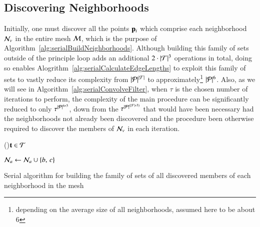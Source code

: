 \subsection{Discovering Neighborhoods}
\label{ch5sSIssDN}
Initially, one must discover all the points $\mathbf{p}_i$ which comprise each neighborhood $\mathcal{N}_v$ in the entire mesh $\mathcal{M}$, which is the purpose of Algorithm~\ref{alg:serialBuildNeighborhoods}. Although building this family of sets outside of the principle loop adds an additional $2\cdot |\mathcal{T}|^3$ operations in total, doing so enables Alogrithm~\ref{alg:serialCalculateEdgeLengths} to exploit this family of sets to vastly reduce its complexity from $|\mathcal{P}|^{|\mathcal{T}|}$ to approximately\footnote{depending on the average size of all neighborhoods, assumed here to be about 6} $|\mathcal{P}|^6$. Also, as we will see in Algorithm~\ref{alg:serialConvolveFilter}, when $\tau$ is the chosen number of iterations to perform, the complexity of the main procedure can be significantly reduced to only $\tau^{|\mathcal{P}|^{6*3}}$, down from the $\tau^{|\mathcal{P}|^{(|\mathcal{F}|*3)}}$ that would have been necessary had the neighborhoods not already been discovered and the procedure been otherwise required to discover the members of $\mathcal{N}_v$ in each iteration.%
%

\begin{algorithm}[h]
	\DontPrintSemicolon


	\bigskip
\nl	{}\FuncArgSty{($\bT$)}\;\label{sbn1}
\nl	\For(){$\mathbf{t} \in \mathcal{T}$}{\label{sbn2}
\nl		{}\;\label{sbn3}
\nl		{}\;\label{sbn4}
\nl		{}\;\label{sbn5}
	}

	\bigskip
\nl	{}\;\label{sbn7}
\nl		$\mathcal{N}_a \leftarrow \mathcal{N}_a \cup \{b,\,c\}$\;\label{sbn8}
	\caption{Serial algorithm for building the family of sets of all discovered members of each neighborhood in the mesh\label{alg:serialBuildNeighborhoods}}
\end{algorithm}%

